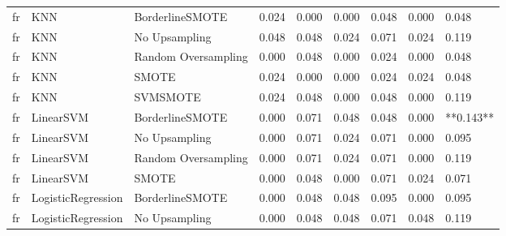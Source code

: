 \begin{tabular}{lllllllll}
      fr &                          KNN &     BorderlineSMOTE & 0.024 &                     0.000 &                 0.000 &                  0.048 &                                   0.000 &     0.048 \\
      fr &                          KNN &       No Upsampling & 0.048 &                     0.048 &                 0.024 &                  0.071 &                                   0.024 &     0.119 \\
      fr &                          KNN & Random Oversampling & 0.000 &                     0.048 &                 0.000 &                  0.024 &                                   0.000 &     0.048 \\
      fr &                          KNN &               SMOTE & 0.024 &                     0.000 &                 0.000 &                  0.024 &                                   0.024 &     0.048 \\
      fr &                          KNN &            SVMSMOTE & 0.024 &                     0.048 &                 0.000 &                  0.048 &                                   0.000 &     0.119 \\
      fr &                    LinearSVM &     BorderlineSMOTE & 0.000 &                     0.071 &                 0.048 &                  0.048 &                                   0.000 & **0.143** \\
      fr &                    LinearSVM &       No Upsampling & 0.000 &                     0.071 &                 0.024 &                  0.071 &                                   0.000 &     0.095 \\
      fr &                    LinearSVM & Random Oversampling & 0.000 &                     0.071 &                 0.024 &                  0.071 &                                   0.000 &     0.119 \\
      fr &                    LinearSVM &               SMOTE & 0.000 &                     0.048 &                 0.000 &                  0.071 &                                   0.024 &     0.071 \\
      fr &           LogisticRegression &     BorderlineSMOTE & 0.000 &                     0.048 &                 0.048 &                  0.095 &                                   0.000 &     0.095 \\
      fr &           LogisticRegression &       No Upsampling & 0.000 &                     0.048 &                 0.048 &                  0.071 &                                   0.048 &     0.119 \\

\end{tabular}

